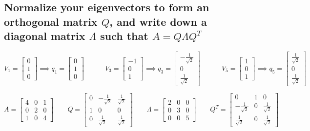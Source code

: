 \subsection{Normalize your eigenvectors to form an orthogonal matrix $Q$, and write down a diagonal matrix $\Lambda$ such that $A = Q\Lambda Q^T$}
\[
	V_1 = \begin{bmatrix} 0 \\ 1 \\ 0 \end{bmatrix} \implies q_1 = \begin{bmatrix} 0 \\ 1 \\ 0 \end{bmatrix} \quad\quad\quad
	V_3 = \begin{bmatrix} -1 \\ 0 \\1 \end{bmatrix} \implies q_3 = \begin{bmatrix} -\frac{1}{\sqrt{2}} \\ 0 \\\frac{1}{\sqrt{2}} \end{bmatrix} \quad\quad\quad
	V_5 = \begin{bmatrix} 1 \\ 0 \\1 \end{bmatrix}  \implies q_5 = \begin{bmatrix} \frac{1}{\sqrt{2}} \\ 0 \\\frac{1}{\sqrt{2}} \end{bmatrix}
\]

\[
	A = \begin{bmatrix}
		4 & 0 & 1 \\
		0 & 2 & 0 \\
		1 & 0 & 4
	\end{bmatrix} \quad\quad
	Q =
	\begin{bmatrix}
		0 & -\frac{1}{\sqrt{2}} & \frac{1}{\sqrt{2}} \\
		1 & 0                   & 0                  \\
		0 & \frac{1}{\sqrt{2}}  & \frac{1}{\sqrt{2}}
	\end{bmatrix} \quad\quad
	\Lambda = \begin{bmatrix}
		2 & 0 & 0 \\
		0 & 3 & 0 \\
		0 & 0 & 5
	\end{bmatrix} \quad\quad
	Q^T =
	\begin{bmatrix}
		0                   & 1 & 0                  \\
		-\frac{1}{\sqrt{2}} & 0 & \frac{1}{\sqrt{2}} \\
		\frac{1}{\sqrt{2}}  & 0 & \frac{1}{\sqrt{2}}
	\end{bmatrix}
\]

